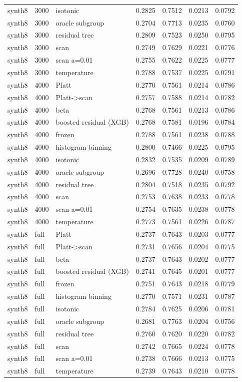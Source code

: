 \begin{tabular}{lllrrrr}
synth8 & 3000 & isotonic & 0.2825 & 0.7512 & 0.0213 & 0.0792 \\
synth8 & 3000 & oracle subgroup & 0.2704 & 0.7713 & 0.0235 & 0.0760 \\
synth8 & 3000 & residual tree & 0.2809 & 0.7523 & 0.0250 & 0.0795 \\
synth8 & 3000 & scan & 0.2749 & 0.7629 & 0.0221 & 0.0776 \\
synth8 & 3000 & scan a=0.01 & 0.2755 & 0.7622 & 0.0225 & 0.0777 \\
synth8 & 3000 & temperature & 0.2788 & 0.7537 & 0.0225 & 0.0791 \\
synth8 & 4000 & Platt & 0.2770 & 0.7561 & 0.0214 & 0.0786 \\
synth8 & 4000 & Platt->scan & 0.2757 & 0.7588 & 0.0214 & 0.0782 \\
synth8 & 4000 & beta & 0.2768 & 0.7561 & 0.0213 & 0.0786 \\
synth8 & 4000 & boosted residual (XGB) & 0.2768 & 0.7581 & 0.0196 & 0.0784 \\
synth8 & 4000 & frozen & 0.2788 & 0.7561 & 0.0238 & 0.0788 \\
synth8 & 4000 & histogram binning & 0.2800 & 0.7466 & 0.0225 & 0.0795 \\
synth8 & 4000 & isotonic & 0.2832 & 0.7535 & 0.0209 & 0.0789 \\
synth8 & 4000 & oracle subgroup & 0.2696 & 0.7728 & 0.0240 & 0.0758 \\
synth8 & 4000 & residual tree & 0.2804 & 0.7518 & 0.0235 & 0.0792 \\
synth8 & 4000 & scan & 0.2753 & 0.7638 & 0.0233 & 0.0778 \\
synth8 & 4000 & scan a=0.01 & 0.2754 & 0.7635 & 0.0238 & 0.0778 \\
synth8 & 4000 & temperature & 0.2773 & 0.7561 & 0.0226 & 0.0787 \\
synth8 & full & Platt & 0.2737 & 0.7643 & 0.0203 & 0.0777 \\
synth8 & full & Platt->scan & 0.2731 & 0.7656 & 0.0204 & 0.0775 \\
synth8 & full & beta & 0.2737 & 0.7643 & 0.0202 & 0.0777 \\
synth8 & full & boosted residual (XGB) & 0.2741 & 0.7645 & 0.0201 & 0.0777 \\
synth8 & full & frozen & 0.2751 & 0.7643 & 0.0218 & 0.0779 \\
synth8 & full & histogram binning & 0.2770 & 0.7571 & 0.0231 & 0.0787 \\
synth8 & full & isotonic & 0.2784 & 0.7625 & 0.0206 & 0.0781 \\
synth8 & full & oracle subgroup & 0.2681 & 0.7763 & 0.0204 & 0.0756 \\
synth8 & full & residual tree & 0.2760 & 0.7620 & 0.0220 & 0.0782 \\
synth8 & full & scan & 0.2742 & 0.7665 & 0.0224 & 0.0778 \\
synth8 & full & scan a=0.01 & 0.2738 & 0.7666 & 0.0213 & 0.0775 \\
synth8 & full & temperature & 0.2739 & 0.7643 & 0.0210 & 0.0778 \\
\bottomrule
\end{tabular}
